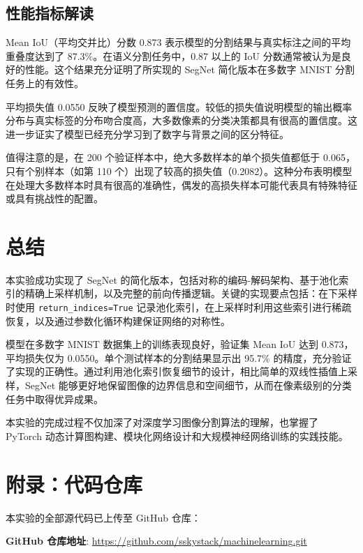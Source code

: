 \documentclass[a4paper]{article}
\begin{document}
\subsection{性能指标解读}

Mean IoU（平均交并比）分数 0.873 表示模型的分割结果与真实标注之间的平均重叠度达到了 87.3\%。在语义分割任务中，0.87 以上的 IoU 分数通常被认为是良好的性能。这个结果充分证明了所实现的 SegNet 简化版本在多数字 MNIST 分割任务上的有效性。

平均损失值 0.0550 反映了模型预测的置信度。较低的损失值说明模型的输出概率分布与真实标签的分布吻合度高，大多数像素的分类决策都具有很高的置信度。这进一步证实了模型已经充分学习到了数字与背景之间的区分特征。

值得注意的是，在 200 个验证样本中，绝大多数样本的单个损失值都低于 0.065，只有个别样本（如第 110 个）出现了较高的损失值（0.2082）。这种分布表明模型在处理大多数样本时具有很高的准确性，偶发的高损失样本可能代表具有特殊特征或具有挑战性的配置。

\section{总结}

本实验成功实现了 SegNet 的简化版本，包括对称的编码-解码架构、基于池化索引的精确上采样机制，以及完整的前向传播逻辑。关键的实现要点包括：在下采样时使用 \texttt{return\_indices=True} 记录池化索引，在上采样时利用这些索引进行稀疏恢复，以及通过参数化循环构建保证网络的对称性。

模型在多数字 MNIST 数据集上的训练表现良好，验证集 Mean IoU 达到 0.873，平均损失仅为 0.0550。单个测试样本的分割结果显示出 95.7\% 的精度，充分验证了实现的正确性。通过利用池化索引恢复细节的设计，相比简单的双线性插值上采样，SegNet 能够更好地保留图像的边界信息和空间细节，从而在像素级别的分类任务中取得优异成果。

本实验的完成过程不仅加深了对深度学习图像分割算法的理解，也掌握了 PyTorch 动态计算图构建、模块化网络设计和大规模神经网络训练的实践技能。

\section{附录：代码仓库}

本实验的全部源代码已上传至 GitHub 仓库：

\textbf{GitHub 仓库地址}: \url{https://github.com/sskystack/machinelearning.git}
\end{document}
